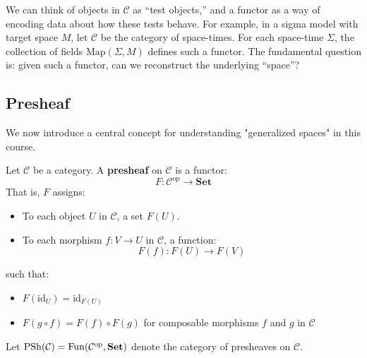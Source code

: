\begin{remark}
We can think of objects in $\mathcal{C}$ as “test objects,” and a functor as a way of encoding data about how these tests behave. For example, in a sigma model with target space $M$, let $\mathcal{C}$ be the category of space-times. For each space-time $\Sigma$, the collection of fields $\mathrm{Map}(\Sigma, M)$ defines such a functor. The fundamental question is: given such a functor, can we reconstruct the underlying “space”?
\end{remark}

\subsection{Presheaf}

We now introduce a central concept for understanding "generalized spaces" in this course.

\begin{definition}[Presheaf]
Let $\mathcal{C}$ be a category. A \textbf{presheaf} on $\mathcal{C}$ is a functor:
\[
F: \mathcal{C}^{\mathrm{op}} \to \mathbf{Set}
\]
That is, $F$ assigns:
\begin{itemize}
    \item To each object $U$ in $\mathcal{C}$, a set $F(U)$.
    \item To each morphism $f: V \to U$ in $\mathcal{C}$, a function:
    \[
    F(f): F(U) \to F(V)
    \]
\end{itemize}
such that:
\begin{itemize}
    \item $F(\mathrm{id}_U) = \mathrm{id}_{F(U)}$
    \item $F(g \circ f) = F(f) \circ F(g)$ for composable morphisms $f$ and $g$ in $\mathcal{C}$
\end{itemize}
\end{definition}

Let $\mathrm{PSh}(\mathcal{C}) = \mathrm{Fun}(\mathcal{C}^{\mathrm{op}}, \mathbf{Set})$ denote the category of presheaves on $\mathcal{C}$.

